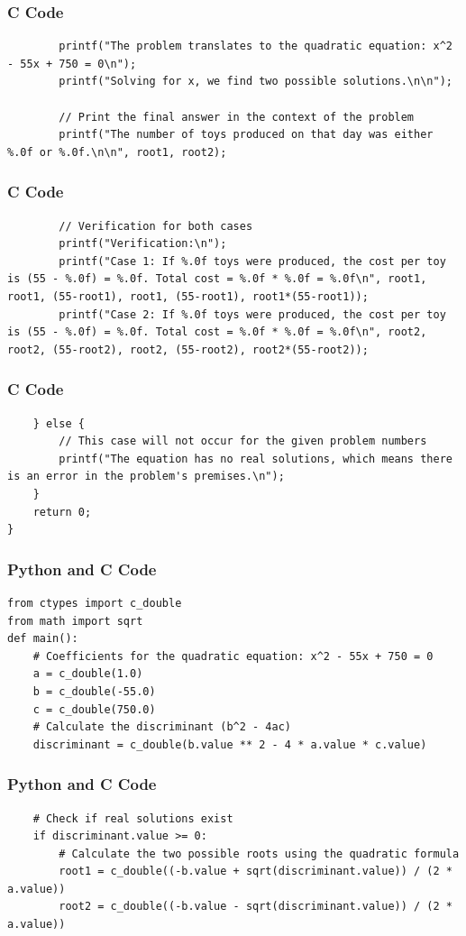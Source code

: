\documentclass{beamer}
\begin{document}
\begin{frame}[fragile]
\frametitle{C Code}
\begin{lstlisting}
        printf("The problem translates to the quadratic equation: x^2 - 55x + 750 = 0\n");
        printf("Solving for x, we find two possible solutions.\n\n");
        
        // Print the final answer in the context of the problem
        printf("The number of toys produced on that day was either %.0f or %.0f.\n\n", root1, root2);
\end{lstlisting}
\end{frame}

\begin{frame}[fragile]
\frametitle{C Code}
\begin{lstlisting}       
        // Verification for both cases
        printf("Verification:\n");
        printf("Case 1: If %.0f toys were produced, the cost per toy is (55 - %.0f) = %.0f. Total cost = %.0f * %.0f = %.0f\n", root1, root1, (55-root1), root1, (55-root1), root1*(55-root1));
        printf("Case 2: If %.0f toys were produced, the cost per toy is (55 - %.0f) = %.0f. Total cost = %.0f * %.0f = %.0f\n", root2, root2, (55-root2), root2, (55-root2), root2*(55-root2));
\end{lstlisting}
\end{frame}

\begin{frame}[fragile]
\frametitle{C Code}
\begin{lstlisting}
    } else {
        // This case will not occur for the given problem numbers
        printf("The equation has no real solutions, which means there is an error in the problem's premises.\n");
    }
    return 0;
}
\end{lstlisting}
\end{frame}

\begin{frame}[fragile]
\frametitle{Python and C Code}
\begin{lstlisting}
from ctypes import c_double
from math import sqrt
def main():
    # Coefficients for the quadratic equation: x^2 - 55x + 750 = 0
    a = c_double(1.0)
    b = c_double(-55.0)
    c = c_double(750.0)
    # Calculate the discriminant (b^2 - 4ac)
    discriminant = c_double(b.value ** 2 - 4 * a.value * c.value)
\end{lstlisting}
\end{frame}

\begin{frame}[fragile]
\frametitle{Python and C Code}
\begin{lstlisting}
    # Check if real solutions exist
    if discriminant.value >= 0:
        # Calculate the two possible roots using the quadratic formula
        root1 = c_double((-b.value + sqrt(discriminant.value)) / (2 * a.value))
        root2 = c_double((-b.value - sqrt(discriminant.value)) / (2 * a.value))
\end{lstlisting}
\end{frame}
\end{document}
